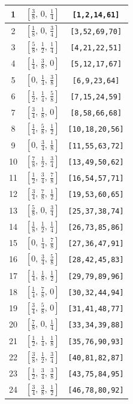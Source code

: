 \documentclass[fleqn,8pt]{jsarticle}
\begin{document}
\begin{longtable}{ccc}
1 & $\left[ \frac{3}{8},\, 0,\, \frac{1}{4} \right]$ & {\tt [1,2,14,61]} \\ \hline
2 & $\left[ \frac{1}{8},\, 0,\, \frac{3}{4} \right]$ & {\tt [3,52,69,70]} \\ \hline
3 & $\left[ \frac{5}{8},\, \frac{1}{2},\, \frac{1}{4} \right]$ & {\tt [4,21,22,51]} \\ \hline
4 & $\left[ \frac{1}{4},\, \frac{3}{8},\, 0 \right]$ & {\tt [5,12,17,67]} \\ \hline
5 & $\left[ 0,\, \frac{1}{4},\, \frac{3}{8} \right]$ & {\tt [6,9,23,64]} \\ \hline
6 & $\left[ \frac{1}{2},\, \frac{1}{4},\, \frac{5}{8} \right]$ & {\tt [7,15,24,59]} \\ \hline
7 & $\left[ \frac{3}{4},\, \frac{1}{8},\, 0 \right]$ & {\tt [8,58,66,68]} \\ \hline
8 & $\left[ \frac{1}{4},\, \frac{5}{8},\, \frac{1}{2} \right]$ & {\tt [10,18,20,56]} \\ \hline
9 & $\left[ 0,\, \frac{3}{4},\, \frac{1}{8} \right]$ & {\tt [11,55,63,72]} \\ \hline
10 & $\left[ \frac{7}{8},\, \frac{1}{2},\, \frac{3}{4} \right]$ & {\tt [13,49,50,62]} \\ \hline
11 & $\left[ \frac{1}{2},\, \frac{3}{4},\, \frac{7}{8} \right]$ & {\tt [16,54,57,71]} \\ \hline
12 & $\left[ \frac{3}{4},\, \frac{7}{8},\, \frac{1}{2} \right]$ & {\tt [19,53,60,65]} \\ \hline
13 & $\left[ \frac{5}{8},\, 0,\, \frac{3}{4} \right]$ & {\tt [25,37,38,74]} \\ \hline
14 & $\left[ \frac{1}{8},\, \frac{1}{2},\, \frac{1}{4} \right]$ & {\tt [26,73,85,86]} \\ \hline
15 & $\left[ 0,\, \frac{1}{4},\, \frac{7}{8} \right]$ & {\tt [27,36,47,91]} \\ \hline
16 & $\left[ 0,\, \frac{3}{4},\, \frac{5}{8} \right]$ & {\tt [28,42,45,83]} \\ \hline
17 & $\left[ \frac{1}{4},\, \frac{1}{8},\, \frac{1}{2} \right]$ & {\tt [29,79,89,96]} \\ \hline
18 & $\left[ \frac{1}{4},\, \frac{7}{8},\, 0 \right]$ & {\tt [30,32,44,94]} \\ \hline
19 & $\left[ \frac{3}{4},\, \frac{5}{8},\, 0 \right]$ & {\tt [31,41,48,77]} \\ \hline
20 & $\left[ \frac{7}{8},\, 0,\, \frac{1}{4} \right]$ & {\tt [33,34,39,88]} \\ \hline
21 & $\left[ \frac{1}{2},\, \frac{1}{4},\, \frac{1}{8} \right]$ & {\tt [35,76,90,93]} \\ \hline
22 & $\left[ \frac{3}{8},\, \frac{1}{2},\, \frac{3}{4} \right]$ & {\tt [40,81,82,87]} \\ \hline
23 & $\left[ \frac{1}{2},\, \frac{3}{4},\, \frac{3}{8} \right]$ & {\tt [43,75,84,95]} \\ \hline
24 & $\left[ \frac{3}{4},\, \frac{3}{8},\, \frac{1}{2} \right]$ & {\tt [46,78,80,92]} \\
\end{longtable}
\end{document}
